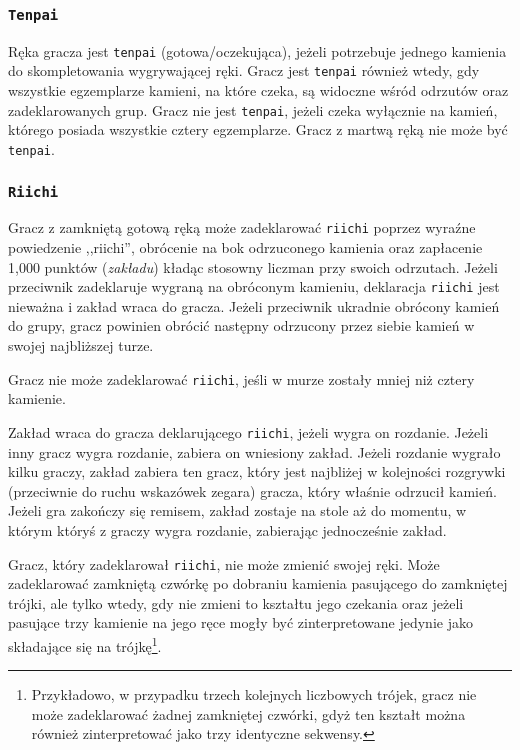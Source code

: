 \subsubsection{\texttt{Tenpai}}
Ręka gracza jest \texttt{tenpai} (gotowa/oczekująca), jeżeli potrzebuje jednego
kamienia do skompletowania wygrywającej ręki.
Gracz jest \texttt{tenpai} również wtedy, gdy wszystkie egzemplarze kamieni, na
które czeka, są widoczne wśród odrzutów oraz zadeklarowanych grup.
Gracz nie jest \texttt{tenpai}, jeżeli czeka wyłącznie na kamień, którego
posiada wszystkie cztery egzemplarze.
Gracz z martwą ręką nie może być \texttt{tenpai}.

\subsubsection{\texttt{Riichi}}
Gracz z zamkniętą gotową ręką może zadeklarować \texttt{riichi} poprzez wyraźne
powiedzenie ,,riichi'', obrócenie na bok odrzuconego kamienia oraz zapłacenie
1,000 punktów (\emph{zakładu}) kładąc stosowny liczman przy swoich odrzutach.
Jeżeli przeciwnik zadeklaruje wygraną na obróconym kamieniu, deklaracja
\texttt{riichi} jest nieważna i zakład wraca do gracza.
Jeżeli przeciwnik ukradnie obrócony kamień do grupy, gracz powinien obrócić
następny odrzucony przez siebie kamień w swojej najbliższej turze.

Gracz nie może zadeklarować \texttt{riichi}, jeśli w murze zostały mniej niż
cztery kamienie.

Zakład wraca do gracza deklarującego \texttt{riichi}, jeżeli wygra on rozdanie.
Jeżeli inny gracz wygra rozdanie, zabiera on wniesiony zakład.
Jeżeli rozdanie wygrało kilku graczy, zakład zabiera ten gracz, który jest
najbliżej w kolejności rozgrywki (przeciwnie do ruchu wskazówek zegara) gracza,
który właśnie odrzucił kamień.
Jeżeli gra zakończy się remisem, zakład zostaje na stole aż do momentu, w którym
któryś z graczy wygra rozdanie, zabierając jednocześnie zakład.

Gracz, który zadeklarował \texttt{riichi}, nie może zmienić swojej ręki.
Może zadeklarować zamkniętą czwórkę po dobraniu kamienia pasującego do
zamkniętej trójki, ale tylko wtedy, gdy nie zmieni to kształtu jego czekania
oraz jeżeli pasujące trzy kamienie na jego ręce mogły być zinterpretowane jedynie jako
składające się na trójkę\footnote{Przykładowo, w przypadku trzech kolejnych
liczbowych trójek, gracz nie może zadeklarować żadnej zamkniętej czwórki, gdyż
ten kształt można również zinterpretować jako trzy identyczne sekwensy.}.

